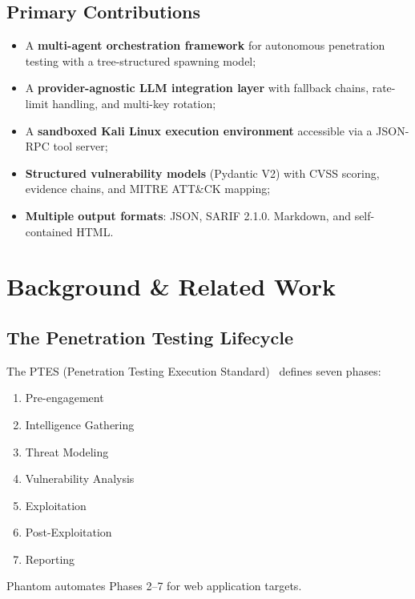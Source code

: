 \documentclass[12pt,a4paper]{article}
\begin{document}
\subsection{Primary Contributions}

\begin{itemize}
  \item A \textbf{multi-agent orchestration framework} for autonomous penetration testing with a tree-structured spawning model;
  \item A \textbf{provider-agnostic LLM integration layer} with fallback chains, rate-limit handling, and multi-key rotation;
  \item A \textbf{sandboxed Kali Linux execution environment} accessible via a JSON-RPC tool server;
  \item \textbf{Structured vulnerability models} (Pydantic V2) with CVSS scoring, evidence chains, and MITRE ATT\&CK mapping;
  \item \textbf{Multiple output formats}: JSON, SARIF 2.1.0. Markdown, and self-contained HTML.
\end{itemize}



\section{Background \& Related Work}

\subsection{The Penetration Testing Lifecycle}

The PTES (Penetration Testing Execution Standard)~\cite{ptes2014} defines seven phases:

\begin{enumerate}
  \item Pre-engagement
  \item Intelligence Gathering
  \item Threat Modeling
  \item Vulnerability Analysis
  \item Exploitation
  \item Post-Exploitation
  \item Reporting
\end{enumerate}

Phantom automates Phases 2--7 for web application targets.
\end{document}
